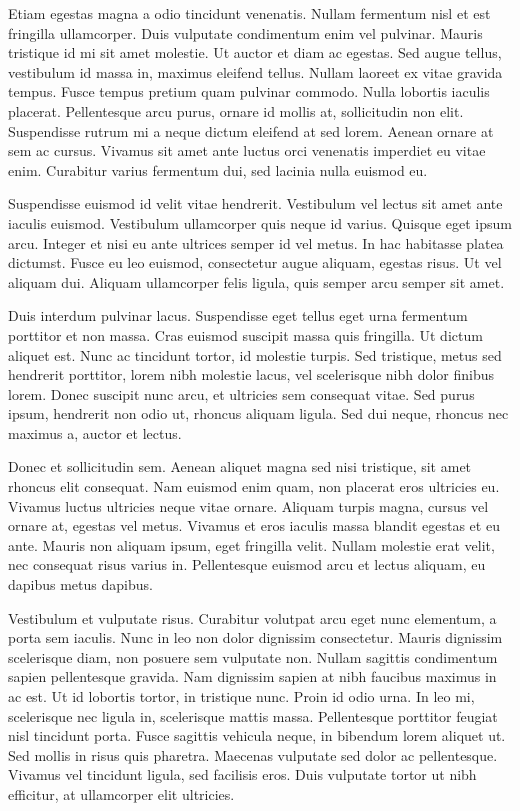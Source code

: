 Etiam egestas magna a odio tincidunt venenatis. Nullam fermentum nisl et est fringilla ullamcorper. Duis vulputate condimentum enim vel pulvinar. Mauris tristique id mi sit amet molestie. Ut auctor et diam ac egestas. Sed augue tellus, vestibulum id massa in, maximus eleifend tellus. Nullam laoreet ex vitae gravida tempus. Fusce tempus pretium quam pulvinar commodo. Nulla lobortis iaculis placerat. Pellentesque arcu purus, ornare id mollis at, sollicitudin non elit. Suspendisse rutrum mi a neque dictum eleifend at sed lorem. Aenean ornare at sem ac cursus. Vivamus sit amet ante luctus orci venenatis imperdiet eu vitae enim. Curabitur varius fermentum dui, sed lacinia nulla euismod eu.

Suspendisse euismod id velit vitae hendrerit. Vestibulum vel lectus sit amet ante iaculis euismod. Vestibulum ullamcorper quis neque id varius. Quisque eget ipsum arcu. Integer et nisi eu ante ultrices semper id vel metus. In hac habitasse platea dictumst. Fusce eu leo euismod, consectetur augue aliquam, egestas risus. Ut vel aliquam dui. Aliquam ullamcorper felis ligula, quis semper arcu semper sit amet.

Duis interdum pulvinar lacus. Suspendisse eget tellus eget urna fermentum porttitor et non massa. Cras euismod suscipit massa quis fringilla. Ut dictum aliquet est. Nunc ac tincidunt tortor, id molestie turpis. Sed tristique, metus sed hendrerit porttitor, lorem nibh molestie lacus, vel scelerisque nibh dolor finibus lorem. Donec suscipit nunc arcu, et ultricies sem consequat vitae. Sed purus ipsum, hendrerit non odio ut, rhoncus aliquam ligula. Sed dui neque, rhoncus nec maximus a, auctor et lectus.

Donec et sollicitudin sem. Aenean aliquet magna sed nisi tristique, sit amet rhoncus elit consequat. Nam euismod enim quam, non placerat eros ultricies eu. Vivamus luctus ultricies neque vitae ornare. Aliquam turpis magna, cursus vel ornare at, egestas vel metus. Vivamus et eros iaculis massa blandit egestas et eu ante. Mauris non aliquam ipsum, eget fringilla velit. Nullam molestie erat velit, nec consequat risus varius in. Pellentesque euismod arcu et lectus aliquam, eu dapibus metus dapibus.

Vestibulum et vulputate risus. Curabitur volutpat arcu eget nunc elementum, a porta sem iaculis. Nunc in leo non dolor dignissim consectetur. Mauris dignissim scelerisque diam, non posuere sem vulputate non. Nullam sagittis condimentum sapien pellentesque gravida. Nam dignissim sapien at nibh faucibus maximus in ac est. Ut id lobortis tortor, in tristique nunc. Proin id odio urna. In leo mi, scelerisque nec ligula in, scelerisque mattis massa. Pellentesque porttitor feugiat nisl tincidunt porta. Fusce sagittis vehicula neque, in bibendum lorem aliquet ut. Sed mollis in risus quis pharetra. Maecenas vulputate sed dolor ac pellentesque. Vivamus vel tincidunt ligula, sed facilisis eros. Duis vulputate tortor ut nibh efficitur, at ullamcorper elit ultricies.

